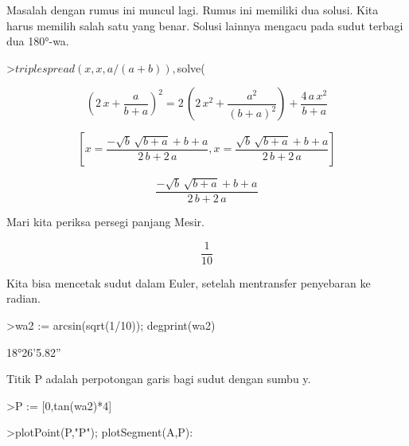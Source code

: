 \documentclass[12pt,Times new roman,letterpaper]{book}
\begin{document}
\begin{eulernootebook}
\begin{eulercomment}
\begin{eulercomment}
\begin{eulernootebook}
\begin{eulercomment}
\begin{eulercomment}
\begin{eulercomment}
\begin{eulercomment}
\begin{eulercomment}
\begin{eulercomment}
\begin{eulernotebook}
\begin{eulercomment}
\begin{eulercomment}
\begin{eulercomment}
\begin{eulercomment}
Masalah dengan rumus ini muncul lagi. Rumus ini memiliki dua solusi.
Kita harus memilih salah satu yang benar. Solusi lainnya mengacu pada
sudut terbagi dua 180°-wa.
\end{eulercomment}
\begin{eulerprompt}
>$triplespread(x,x,a/(a+b)), $solve(%
\end{eulerprompt}
\begin{eulerformula}
\[
\left(2\,x+\frac{a}{b+a}\right)^2=2\,\left(2\,x^2+\frac{a^2}{\left(
 b+a\right)^2}\right)+\frac{4\,a\,x^2}{b+a}
\]
\end{eulerformula}
\begin{eulerformula}
\[
\left[ x=\frac{-\sqrt{b}\,\sqrt{b+a}+b+a}{2\,b+2\,a} , x=\frac{
 \sqrt{b}\,\sqrt{b+a}+b+a}{2\,b+2\,a} \right] 
\]
\end{eulerformula}
\begin{eulerformula}
\[
\frac{-\sqrt{b}\,\sqrt{b+a}+b+a}{2\,b+2\,a}
\]
\end{eulerformula}
\begin{eulercomment}
Mari kita periksa persegi panjang Mesir.
\end{eulercomment}
\begin{eulerformula}
\[
\frac{1}{10}
\]
\end{eulerformula}
\begin{eulercomment}
Kita bisa mencetak sudut dalam Euler, setelah mentransfer penyebaran
ke radian.
\end{eulercomment}
\begin{eulerprompt}
>wa2 := arcsin(sqrt(1/10)); degprint(wa2)
\end{eulerprompt}
\begin{euleroutput}
  18°26'5.82''
\end{euleroutput}
\begin{eulercomment}
Titik P adalah perpotongan garis bagi sudut dengan sumbu y.
\end{eulercomment}
\begin{eulerprompt}
>P := [0,tan(wa2)*4]
\end{eulerprompt}
\begin{euleroutput}
  [0,  1.33333]
\end{euleroutput}
\begin{eulerprompt}
>plotPoint(P,"P"); plotSegment(A,P):
\end{eulerprompt}

\end{eulercomment}
\end{eulercomment}
\end{eulercomment}
\end{eulernotebook}
\end{eulercomment}
\end{eulercomment}
\end{eulercomment}
\end{eulercomment}
\end{eulercomment}
\end{eulercomment}
\end{eulernootebook}
\end{eulercomment}
\end{eulercomment}
\end{eulernootebook}
\end{document}

